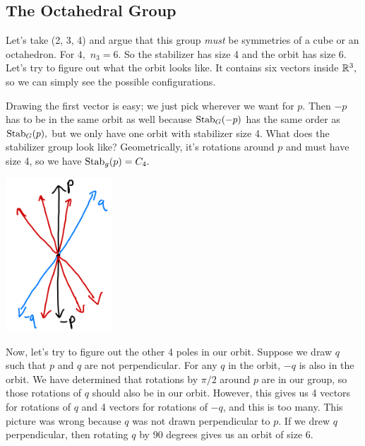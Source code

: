 \subsection{The Octahedral Group}
\begin{example}
Let's take (2, 3, 4) and argue that this group \emph{must} be symmetries of a cube or an octahedron. For $4,$ $n_3 = 6.$ So the stabilizer has size 4 and the orbit has size 6. Let's try to figure out what the orbit looks like. It contains six vectors inside $\mathbb R^3,$ so we can simply see the possible configurations. 

Drawing the first vector is easy; we just pick wherever we want for $p.$ Then $-p$ has to be in the same orbit as well because $\operatorname{Stab}_G(-p)$ has the same order as $\operatorname{Stab}_G(p),$ but we only have one orbit with stabilizer size 4. What does the stabilizer group look like? Geometrically, it's rotations around $p$ and must have size 4, so we have $\operatorname{Stab}_g(p) = C_4.$ 
\begin{center}
    \includegraphics[width=4cm]{Lecture Files and Images/lec18-wrongpoles.png}
\end{center}
Now, let's try to figure out the other 4 poles in our orbit. Suppose we draw $q$ such that $p$ and $q$ are not perpendicular.
For any $q$ in the orbit, $-q$ is also in the orbit. We have determined that rotations by $\pi/2$ around $p$ are in our group, so those rotations of $q$ should also be in our orbit. However, this gives us 4 vectors for rotations of $q$ and 4 vectors for rotations of $-q$, and this is too many. 
This picture was wrong because $q$ was not drawn perpendicular to $p.$ If we drew $q$ perpendicular, then rotating $q$ by 90 degrees gives us an orbit of size 6. 


\end{example}
